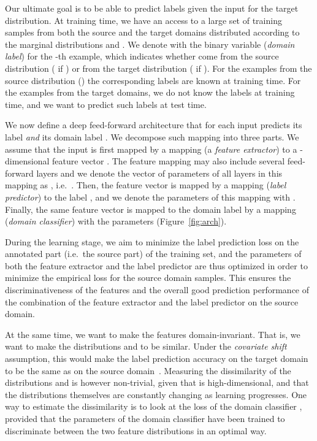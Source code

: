 \documentclass{article}
\newcommand{\fig}[1]{Figure~\ref{fig:#1}}
\begin{document}
Our ultimate goal is to be able to predict labels  given the input  for the target distribution. At training time, we have an access to a large set of training samples  from both the source and the target domains distributed according to the marginal distributions  and . We denote with  the binary variable ({\em domain label}) for the -th example, which indicates whether  come from the source distribution ( if ) or from the target distribution ( if ). For the examples from the source distribution () the corresponding labels  are known at training time. For the examples from the target domains, we do not know the labels at training time, and we want to predict such labels at test time.

We now define a deep feed-forward architecture that for each input  predicts its label  {\em and} its domain label . We decompose such mapping into three parts. We assume that the input  is first mapped by a mapping  (a {\em feature extractor}) to a -dimensional feature vector . The feature mapping may also include several feed-forward layers and we denote the vector of parameters of all layers in this mapping as , i.e.\ . Then, the feature vector  is mapped by a mapping  ({\em label predictor}) to the label , and we denote the parameters of this mapping with . Finally, the same feature vector  is mapped to the domain label  by a mapping  ({\em domain classifier}) with the parameters  (\fig{arch}).

During the learning stage, we aim to minimize the label prediction loss on the annotated part (i.e.\ the source part) of the training set, and the parameters of both the feature extractor and the label predictor are thus optimized in order to minimize the empirical loss for the source domain samples. This ensures the discriminativeness of the features  and the overall good prediction performance of the combination of the feature extractor and the label predictor on the source domain.

At the same time, we want to make the features  domain-invariant. That is, we want to make the distributions  and  to be similar. Under the {\em covariate shift} assumption, this would make the label prediction accuracy on the target domain to be the same as on the source domain~\cite{Shimodaira00}. Measuring the dissimilarity of the distributions  and  is however non-trivial, given that  is high-dimensional, and that the distributions themselves are constantly changing as learning progresses. One way to estimate the dissimilarity is to look at the loss of the domain classifier , provided that the parameters  of the domain classifier have been trained to discriminate between the two feature distributions in an optimal way. 
\end{document}
